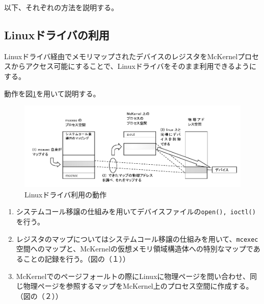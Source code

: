 \documentclass[twoside,11pt,fleqn]{book}
\begin{document}
以下、それぞれの方法を説明する。

\subsection{Linuxドライバの利用}
Linuxドライバ経由でメモリマップされたデバイスのレジスタをMcKernelプロセスからアクセス可能にすることで、Linuxドライバをそのまま利用できるようにする。

動作を図\ref{fig:device_map}を用いて説明する。
%
\begin{figure}[htb]
\centering
\includegraphics[width=12cm]{figs/device_map.pdf}
\vspace{-0em}\caption{Linuxドライバ利用の動作}
\label{fig:device_map}
\vspace{-0em}
\end{figure}
%
\begin{enumerate}
\item システムコール移譲の仕組みを用いてデバイスファイルの\texttt{open(), ioctl()}を行う。
\item レジスタのマップについてはシステムコール移譲の仕組みを用いて、\texttt{mcexec}空間へのマップと、McKernelの仮想メモリ領域構造体への特別なマップであることの記録を行う。（図の（１））
\item McKernelでのページフォールトの際にLinuxに物理ページを問い合わせ、同じ物理ページを参照するマップをMcKernel上のプロセス空間に作成する。（図の（２））
\end{enumerate}
\FloatBarrier
\end{document}
